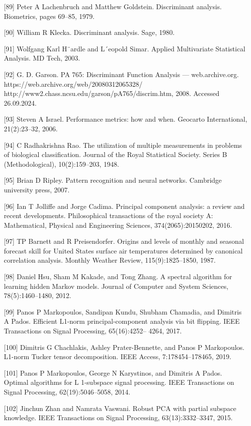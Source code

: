 \documentclass[preprint,12pt]{elsarticle}
\begin{document}
[89] Peter A Lachenbruch and Matthew Goldstein. Discriminant analysis. Biometrics, pages 69–85, 1979. 

[90] William R Klecka. Discriminant analysis. Sage, 1980. 

[91] Wolfgang Karl H¨ardle and L´eopold Simar. Applied Multivariate Statistical Analysis. MD Tech, 2003. 

[92] G. D. Garson. PA 765: Discriminant Function Analysis — web.archive.org. https://web.archive.org/web/20080312065328/ http://www2.chass.ncsu.edu/garson/pA765/discrim.htm, 2008. Accessed 26.09.2024. 

[93] Steven A Israel. Performance metrics: how and when. Geocarto International, 21(2):23–32, 2006. 

[94] C Radhakrishna Rao. The utilization of multiple measurements in problems of biological classification. Journal of the Royal Statistical Society. Series B (Methodological), 10(2):159–203, 1948. 

[95] Brian D Ripley. Pattern recognition and neural networks. Cambridge university press, 2007. 

[96] Ian T Jolliffe and Jorge Cadima. Principal component analysis: a review and recent developments. Philosophical transactions of the royal society A: Mathematical, Physical and Engineering Sciences, 374(2065):20150202, 2016. 

[97] TP Barnett and R Preisendorfer. Origins and levels of monthly and seasonal forecast skill for United States surface air temperatures determined by canonical correlation analysis. Monthly Weather Review, 115(9):1825–1850, 1987. 

[98] Daniel Hsu, Sham M Kakade, and Tong Zhang. A spectral algorithm for learning hidden Markov models. Journal of Computer and System Sciences, 78(5):1460–1480, 2012. 

[99] Panos P Markopoulos, Sandipan Kundu, Shubham Chamadia, and Dimitris A Pados. Efficient L1-norm principal-component analysis via bit flipping. IEEE Transactions on Signal Processing, 65(16):4252– 4264, 2017. 

[100] Dimitris G Chachlakis, Ashley Prater-Bennette, and Panos P Markopoulos. L1-norm Tucker tensor decomposition. IEEE Access, 7:178454–178465, 2019. 

[101] Panos P Markopoulos, George N Karystinos, and Dimitris A Pados. Optimal algorithms for L {1}-subspace signal processing. IEEE Transactions on Signal Processing, 62(19):5046–5058, 2014. 

[102] Jinchun Zhan and Namrata Vaswani. Robust PCA with partial subspace knowledge. IEEE Transactions on Signal Processing, 63(13):3332–3347, 2015. 
\end{document}
